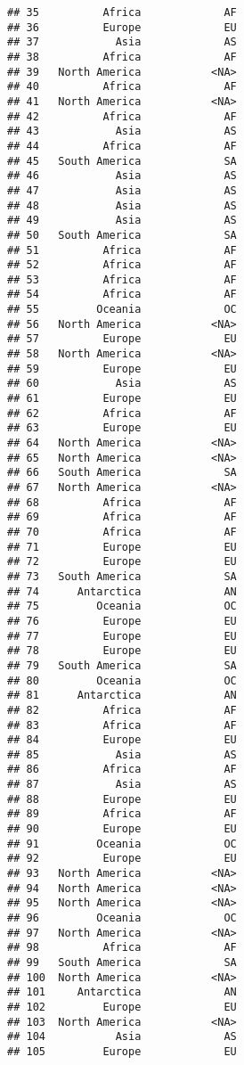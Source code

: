 \documentclass[
]{article}
\begin{document}
\begin{verbatim}
## 35          Africa             AF
## 36          Europe             EU
## 37            Asia             AS
## 38          Africa             AF
## 39   North America           <NA>
## 40          Africa             AF
## 41   North America           <NA>
## 42          Africa             AF
## 43            Asia             AS
## 44          Africa             AF
## 45   South America             SA
## 46            Asia             AS
## 47            Asia             AS
## 48            Asia             AS
## 49            Asia             AS
## 50   South America             SA
## 51          Africa             AF
## 52          Africa             AF
## 53          Africa             AF
## 54          Africa             AF
## 55         Oceania             OC
## 56   North America           <NA>
## 57          Europe             EU
## 58   North America           <NA>
## 59          Europe             EU
## 60            Asia             AS
## 61          Europe             EU
## 62          Africa             AF
## 63          Europe             EU
## 64   North America           <NA>
## 65   North America           <NA>
## 66   South America             SA
## 67   North America           <NA>
## 68          Africa             AF
## 69          Africa             AF
## 70          Africa             AF
## 71          Europe             EU
## 72          Europe             EU
## 73   South America             SA
## 74      Antarctica             AN
## 75         Oceania             OC
## 76          Europe             EU
## 77          Europe             EU
## 78          Europe             EU
## 79   South America             SA
## 80         Oceania             OC
## 81      Antarctica             AN
## 82          Africa             AF
## 83          Africa             AF
## 84          Europe             EU
## 85            Asia             AS
## 86          Africa             AF
## 87            Asia             AS
## 88          Europe             EU
## 89          Africa             AF
## 90          Europe             EU
## 91         Oceania             OC
## 92          Europe             EU
## 93   North America           <NA>
## 94   North America           <NA>
## 95   North America           <NA>
## 96         Oceania             OC
## 97   North America           <NA>
## 98          Africa             AF
## 99   South America             SA
## 100  North America           <NA>
## 101     Antarctica             AN
## 102         Europe             EU
## 103  North America           <NA>
## 104           Asia             AS
## 105         Europe             EU

\end{verbatim}
\end{document}
